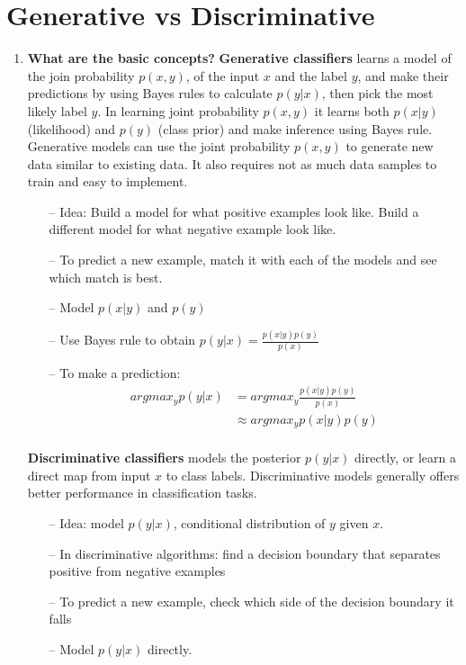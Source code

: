 \documentclass{article}
\begin{document}
\section{Generative vs Discriminative}
\noindent
\begin{enumerate}
    \item \textbf{What are the basic concepts?}
    \noindent 
    \smallbreak
    \textbf{Generative classifiers} learns a model of the join probability $p(x, y)$, of the input $x$ and the label $y$, and make their predictions by using Bayes rules to calculate $p(y|x)$, then pick the most likely label $y$.\cite{4} In learning joint probability $p(x, y)$ it learns both $p(x|y)$ (likelihood) and $p(y)$ (class prior) and make inference using Bayes rule. Generative models can use the joint probability $p(x, y)$ to generate new data similar to existing data. It also requires not as much data samples to train and easy to implement.
    \begin{itemize}
        \item[--] Idea: Build a model for what positive examples look like. Build a different model for what negative example look like.
        \item[--] To predict a new example, match it with each of the models and see which match is best.
        \item[--] Model $p(x|y)$ and $p(y)$
        \item[--] Use Bayes rule to obtain $p(y|x) = \frac{p(x|y)p(y)}{p(x)}$
        \item[--] To make a prediction: \\
        \begin{align*}
            argmax_{y} p(y|x) &= argmax_{y} \frac{p(x|y)p(y)}{p(x)} \\
              &\approx argmax_{y} p(x|y)p(y)  \\ 
        \end{align*}
        
    \end{itemize}

    \noindent 
    \smallbreak
    \textbf{Discriminative classifiers} models the posterior $p(y|x)$ directly, or learn a direct map from input $x$ to class labels.\cite{4} Discriminative models generally offers better performance in classification tasks.
    \begin{itemize}
        \item[--] Idea: model $p(y|x)$, conditional distribution of $y$ given $x$.
        \item[--] In discriminative algorithms: find a decision boundary that separates positive from negative examples
        \item[--] To predict a new example, check which side of the decision boundary it falls
        \item[--] Model $p(y|x)$ directly.
    \end{itemize}
    

\end{enumerate}
\end{document}
